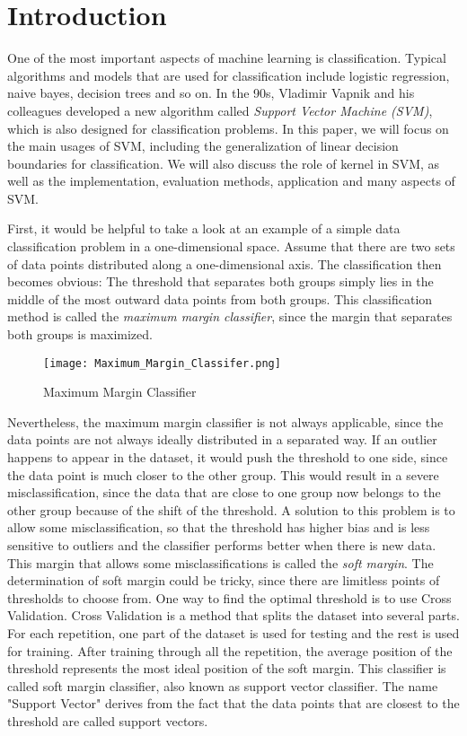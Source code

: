 
\section{Introduction}
One of the most important aspects of machine learning is classification. Typical algorithms and models
that are used for classification include logistic regression, naive bayes, decision trees and so on. In the 90s, 
Vladimir Vapnik and his colleagues developed a new algorithm called \emph{Support Vector Machine (SVM)}, 
which is also designed for classification problems. In this paper,
we will focus on the main usages of SVM, including the generalization of linear decision boundaries for classification.
We will also discuss the role of kernel in SVM, as well as the implementation, evaluation methods, application and many aspects of SVM.


First, it would be helpful to take a look at an example of a simple data classification problem
in a one-dimensional space.
Assume that there are two sets of data points distributed along a one-dimensional axis. The classification then
becomes obvious: The threshold that separates both groups simply lies in the middle of the most outward data points
from both groups. This classification method is called the \emph{maximum margin classifier}, since the margin that separates both
groups is maximized.

\begin{figure}[h]%
    \begin{center}%
        \texttt{[image: Maximum\_Margin\_Classifer.png]}%
        \caption{Maximum Margin Classifier}\label{fig:}%
    \end{center}%
\end{figure}

Nevertheless, the maximum margin classifier is not always applicable, since the data points are not always ideally distributed
in a separated way. If an outlier happens to appear in the dataset, it would push the threshold to one side, since the data point
is much closer to the other group. This would result in a severe misclassification, since the data that are close to one
group now belongs to the other group because of the shift of the threshold. A solution to this problem is to allow some
misclassification, so that the threshold has higher bias and is less sensitive to outliers and the classifier performs better
when there is new data. This margin that allows some misclassifications is called the \emph{soft margin}. The determination of soft margin 
could be tricky, since there are limitless points of thresholds to choose from. One way to find the optimal threshold
is to use Cross Validation. Cross Validation is a method that splits the dataset into several parts. For each repetition, 
one part of the dataset is used for testing and the rest is used for training. After training through all the repetition, the 
average position of the threshold represents the most ideal position of the soft margin. This classifier is called
soft margin classifier, also known as support vector classifier. The name "Support Vector" derives from the fact that
the data points that are closest to the threshold are called support vectors.

